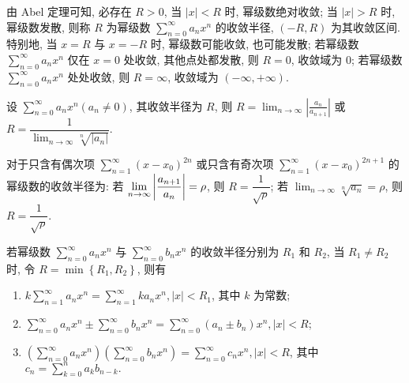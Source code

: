 \begin{definition}[收敛半径与收敛区间]
    由 Abel 定理可知, 必存在 $ R>0 $, 当 $ |x|<R $ 时, 幂级数绝对收敛; 当 $ |x|>R $ 时, 幂级数发散, 则称 $ R $ 为幂级数 $\displaystyle \sum_{n=0}^{\infty} a_{n} x^{n} $ 的收敛半径, $(-R, R) $ 为其收敛区间.\\
    特别地, 当 $ x=R $ 与 $ x=-R $ 时, 幂级数可能收敛, 也可能发散;
    若幂级数 $\displaystyle \sum_{n=0}^{\infty} a_{n} x^{n} $ 仅在 $ x=0 $ 处收敛, 其他点处都发散, 则 $ R=0 $, 收敛域为 $ \qty{0}$;
    若幂级数 $\displaystyle \sum_{n=0}^{\infty} a_{n} x^{n} $ 处处收敛, 则 $ R=\infty $, 收敛域为 $ (-\infty,+\infty) $.
\end{definition}

\begin{theorem}
    设 $\displaystyle \sum_{n=0}^{\infty} a_{n} x^{n}\left(a_{n} \neq 0\right) $, 其收敛半径为 $ R $, 
    则 $\displaystyle  R=\lim _{n \rightarrow \infty}\left|\frac{a_{n}}{a_{n+1}}\right| $ 或 $\displaystyle R=\dfrac{1}{\displaystyle\lim _{n \rightarrow \infty} \sqrt[n]{\left|a_{n}\right|}} .$
\end{theorem}

\begin{theorem}[奇偶次项幂级数的收敛半径]
    对于只含有偶次项 $\displaystyle\sum_{n=1}^{\infty}(x-x_0)^{2n}$ 或只含有奇次项 $\displaystyle\sum_{n=1}^{\infty}(x-x_0)^{2n+1}$ 的幂级数的收敛半径为:
    若 $\displaystyle\lim_{n\to\infty}\qty|\dfrac{a_{n+1}}{a_n}|=\rho$, 则 $R=\dfrac{1}{\sqrt{\rho}}$; 若 $\displaystyle\lim_{n\to\infty}\sqrt[n]{a_n}=\rho$, 则 $R=\dfrac{1}{\sqrt{\rho}}.$
\end{theorem}

\begin{theorem}[幂级数的运算性质]
    若幂级数 $\displaystyle \sum_{n=0}^{\infty} a_{n} x^{n} $ 与 $\displaystyle \sum_{n=0}^{\infty} b_{n} x^{n} $ 的收敛半径分别为 $ R_{1} $ 和 $ R_{2} $, 
    当 $ R_{1} \neq R_{2} $ 时, 令 $ R   =\min \left\{R_{1},R_{2}\right\} $, 则有
    \begin{enumerate}[label=(\arabic{*})]
        \item $\displaystyle k \sum_{n=1}^{\infty} a_{n} x^{n}=\sum_{n=1}^{\infty} k a_{n} x^{n},|x|<R_{1} $, 其中 $ k $ 为常数;
        \item $\displaystyle \sum_{n=0}^{\infty} a_{n} x^{n} \pm \sum_{n=0}^{\infty} b_{n} x^{n}=\sum_{n=0}^{\infty}\left(a_{n} \pm b_{n}\right) x^{n},|x|<R $;
        \item $\displaystyle \left(\sum_{n=0}^{\infty} a_{n} x^{n}\right)\left(\sum_{n=0}^{\infty} b_{n} x^{n}\right)=\sum_{n=0}^{\infty} c_{n} x^{n},|x|<R $, 其中 $\displaystyle c_{n}=\sum_{k=0}^{n} a_{k} b_{n-k} .$
    \end{enumerate}
\end{theorem}


